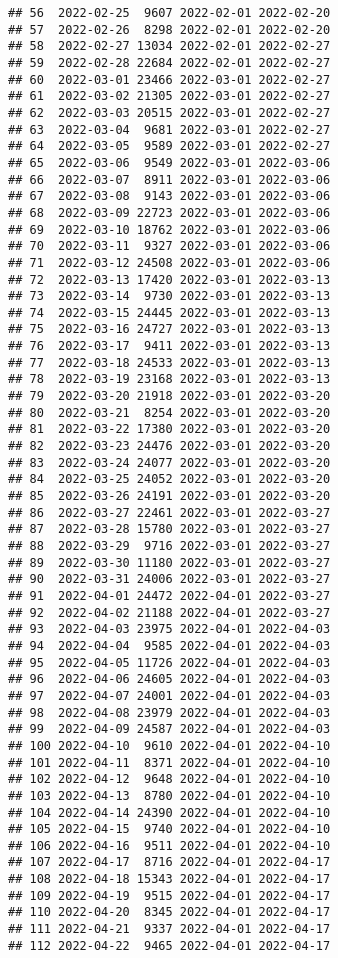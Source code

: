 \documentclass[
]{article}
\begin{document}
\begin{verbatim}
## 56  2022-02-25  9607 2022-02-01 2022-02-20
## 57  2022-02-26  8298 2022-02-01 2022-02-20
## 58  2022-02-27 13034 2022-02-01 2022-02-27
## 59  2022-02-28 22684 2022-02-01 2022-02-27
## 60  2022-03-01 23466 2022-03-01 2022-02-27
## 61  2022-03-02 21305 2022-03-01 2022-02-27
## 62  2022-03-03 20515 2022-03-01 2022-02-27
## 63  2022-03-04  9681 2022-03-01 2022-02-27
## 64  2022-03-05  9589 2022-03-01 2022-02-27
## 65  2022-03-06  9549 2022-03-01 2022-03-06
## 66  2022-03-07  8911 2022-03-01 2022-03-06
## 67  2022-03-08  9143 2022-03-01 2022-03-06
## 68  2022-03-09 22723 2022-03-01 2022-03-06
## 69  2022-03-10 18762 2022-03-01 2022-03-06
## 70  2022-03-11  9327 2022-03-01 2022-03-06
## 71  2022-03-12 24508 2022-03-01 2022-03-06
## 72  2022-03-13 17420 2022-03-01 2022-03-13
## 73  2022-03-14  9730 2022-03-01 2022-03-13
## 74  2022-03-15 24445 2022-03-01 2022-03-13
## 75  2022-03-16 24727 2022-03-01 2022-03-13
## 76  2022-03-17  9411 2022-03-01 2022-03-13
## 77  2022-03-18 24533 2022-03-01 2022-03-13
## 78  2022-03-19 23168 2022-03-01 2022-03-13
## 79  2022-03-20 21918 2022-03-01 2022-03-20
## 80  2022-03-21  8254 2022-03-01 2022-03-20
## 81  2022-03-22 17380 2022-03-01 2022-03-20
## 82  2022-03-23 24476 2022-03-01 2022-03-20
## 83  2022-03-24 24077 2022-03-01 2022-03-20
## 84  2022-03-25 24052 2022-03-01 2022-03-20
## 85  2022-03-26 24191 2022-03-01 2022-03-20
## 86  2022-03-27 22461 2022-03-01 2022-03-27
## 87  2022-03-28 15780 2022-03-01 2022-03-27
## 88  2022-03-29  9716 2022-03-01 2022-03-27
## 89  2022-03-30 11180 2022-03-01 2022-03-27
## 90  2022-03-31 24006 2022-03-01 2022-03-27
## 91  2022-04-01 24472 2022-04-01 2022-03-27
## 92  2022-04-02 21188 2022-04-01 2022-03-27
## 93  2022-04-03 23975 2022-04-01 2022-04-03
## 94  2022-04-04  9585 2022-04-01 2022-04-03
## 95  2022-04-05 11726 2022-04-01 2022-04-03
## 96  2022-04-06 24605 2022-04-01 2022-04-03
## 97  2022-04-07 24001 2022-04-01 2022-04-03
## 98  2022-04-08 23979 2022-04-01 2022-04-03
## 99  2022-04-09 24587 2022-04-01 2022-04-03
## 100 2022-04-10  9610 2022-04-01 2022-04-10
## 101 2022-04-11  8371 2022-04-01 2022-04-10
## 102 2022-04-12  9648 2022-04-01 2022-04-10
## 103 2022-04-13  8780 2022-04-01 2022-04-10
## 104 2022-04-14 24390 2022-04-01 2022-04-10
## 105 2022-04-15  9740 2022-04-01 2022-04-10
## 106 2022-04-16  9511 2022-04-01 2022-04-10
## 107 2022-04-17  8716 2022-04-01 2022-04-17
## 108 2022-04-18 15343 2022-04-01 2022-04-17
## 109 2022-04-19  9515 2022-04-01 2022-04-17
## 110 2022-04-20  8345 2022-04-01 2022-04-17
## 111 2022-04-21  9337 2022-04-01 2022-04-17
## 112 2022-04-22  9465 2022-04-01 2022-04-17

\end{verbatim}
\end{document}
